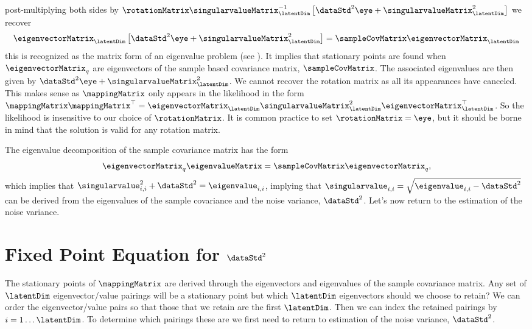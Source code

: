 post-multiplying both sides by $\rotationMatrix \singularvalueMatrix_\latentDim^{-1} \left[\dataStd^2\eye + \singularvalueMatrix_\latentDim^2\right]$ we recover
\[
\eigenvectorMatrix_\latentDim\left[\dataStd^2\eye + \singularvalueMatrix_\latentDim^2\right] = \sampleCovMatrix \eigenvectorMatrix_\latentDim 
\]
this is recognized as the matrix form of an eigenvalue problem (see
). It implies that stationary points are found
when $\eigenvectorMatrix_q$ are eigenvectors of the sample based
covariance matrix, $\sampleCovMatrix$. The associated eigenvalues are
then given by $\dataStd^2\eye + \singularvalueMatrix_\latentDim^2$. We cannot
recover the rotation matrix as all its appearances have canceled. This
makes sense as $\mappingMatrix$ only appears in the likelihood in the
form $\mappingMatrix\mappingMatrix^\top = \eigenvectorMatrix_\latentDim
\singularvalueMatrix_\latentDim^2 \eigenvectorMatrix_\latentDim^\top$. So the likelihood
is insensitive to our choice of $\rotationMatrix$. It is common
practice to set $\rotationMatrix=\eye$, but it should be borne in mind that the solution is valid for any rotation matrix.

The eigenvalue decomposition of the sample covariance matrix has the form
\[
\eigenvectorMatrix_q \eigenvalueMatrix = \sampleCovMatrix \eigenvectorMatrix_q,
\]
which implies that $\singularvalue_{i,i}^2 + \dataStd^2 =
\eigenvalue_{i,i}$, implying that $\singularvalue_{i,i} =
\sqrt{\eigenvalue_{i,i} - \dataStd^2}$ can be derived from the
eigenvalues of the sample covariance and the noise variance,
$\dataStd^2$. Let's now return to the estimation of the noise
variance.

\section{Fixed Point Equation for $\dataStd^2$}

The stationary points of $\mappingMatrix$ are derived through the
eigenvectors and eigenvalues of the sample covariance matrix. Any set
of $\latentDim$ eigenvector/value pairings will be a stationary point
but which $\latentDim$ eigenvectors should we choose to retain? We can order the eigenvector/value pairs so that those that we retain are the first $\latentDim$. Then we can index the retained pairings by $i=1\dots
\latentDim$. To determine which pairings these are we first
need to return to estimation of the noise variance, $\dataStd^2$. 

